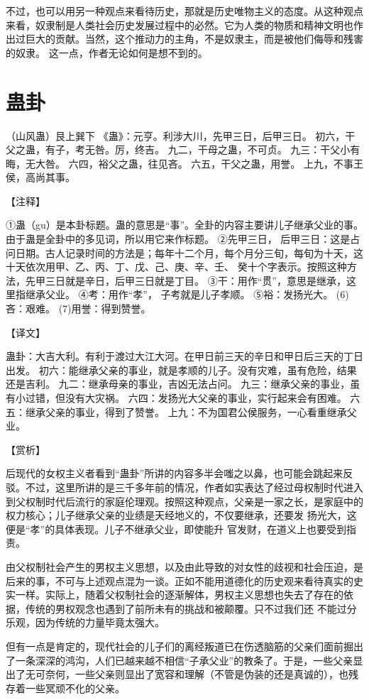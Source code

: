 \documentclass[12pt,UTF8]{ctexbook}
\begin{document}
不过，也可以用另一种观点来看待历史，那就是历史唯物主义的态度。从这种观点来看，奴隶制是人类社会历史发展过程中的必然。它为人类的物质和精神文明也作出过巨大的贡献。当然，这个推动力的主角，不是奴隶主，而是被他们侮辱和残害的奴隶。 这一点，作者无论如何是想不到的。

\chapter{蛊卦}

（山风蛊）艮上巽下
《蛊》：元亨。利涉大川，先甲三日，后甲三日。
初六，干父之蛊，有子，考无咎。厉，终吉。
九二，干母之蛊，不可贞。
九三：干父小有晦，无大咎。
六四，裕父之蛊，往见吝。
六五，干父之蛊，用誉。
上九，不事王侯，高尚其事。

【注释】

①蛊（gu）是本卦标题。蛊的意思是“事”。全卦的内容主要讲儿子继承父业的事。由于蛊是全卦中的多见词，所以用它来作标题。
②先甲三日， 后甲三日：这是占问日期。古人记录时间的方法是；每年十二个月，每个月分三旬，每旬为十天，这十天依次用甲、乙、丙、丁、戊、己、庚、辛、壬、 癸十个字表示。按照这种方法，先甲三日就是辛日，后甲三日就是丁目。
③干：用作“贯”，意思是继承，这里指继承父业。
④考：用作“孝”， 子考就是儿子孝顺。
⑤裕：发扬光大。
(6)吝：艰难。
(7)用誉：得到赞誉。

【译文】

蛊卦：大吉大利。有利于渡过大江大河。在甲日前三天的辛日和甲日后三天的丁日出发。
初六：能继承父亲的事业，就是孝顺的儿子。没有灾难，虽有危险，结果还是吉利。
九二：继承母亲的事业，吉凶无法占问。
九三：继承父亲的事业，虽有小过错，但没有大灾祸。
六四：发扬光大父亲的事业，实行起来会有困难。
六五：继承父亲的事业，得到了赞誉。
上九：不为国君公侯服务，一心看重继承父业。

【赏析】

后现代的女权主义者看到“蛊卦”所讲的内容多半会嗤之以鼻，也可能会跳起来反驳。不过，这里所讲的是三千多年前的情况，作者如实表达了经过母权制时代进入到父权制时代后流行的家庭伦理观。按照这种观点，父亲是一家之长，是家庭中的权力核心；儿子继承父亲的业绩是天经地义的，不仅要继承，还要发 扬光大，这便是“孝”的具体表现。儿子不继承父业，即使能升 官发财，在道义上也要受到指责。

由父权制社会产生的男权主义思想，以及由此导致的对女性的歧视和社会压迫，是后来的事，不可与上述观点混为一谈。正如不能用道德化的历史观来看待真实的史实一样。实际上，随着父权制社会的逐渐解体，男权主义思想也失去了存在的依据，传统的男权观念也遇到了前所未有的挑战和被颠覆。只不过我们还 不能过分乐观，因为传统的力量毕竟太强大。

但有一点是肯定的，现代社会的儿子们的离经叛道已在伤透脑筋的父亲们面前掘出了一条深深的鸿沟，人们已越来越不相信“子承父业”的教条了。于是，一些父亲显出了无可奈何，一些父亲则显出了宽容和理解（不管是伪装的还是真诚的），也残存着一些冥顽不化的父亲。
\end{document}

